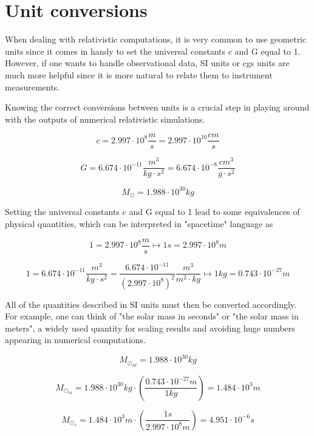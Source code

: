 \appendix
{}
\chapter{Unit conversions}\label{unit conv}

When dealing with relativistic computations, it is very common to use geometric units since it comes in handy to set the universal constants c and G equal to 1. However, if one wants to handle observational data, SI units or cgs units are much more helpful since it is more natural to relate them to instrument measurements.

Knowing the correct conversions between units is a crucial step in playing around with the outputs of numerical relativistic simulations.

$$
c = 2.997\cdot10^8 \frac{m}{s} = 2.997\cdot10^{10} \frac{cm}{s}
$$

$$ 
G = 6.674\cdot10^{-11} \frac{m^3}{kg \cdot s^2}  = 6.674\cdot10^{-8} \frac{cm^3}{g \cdot s^2}
$$

$$
M_{\odot} = 1.988\cdot10^{30} kg
$$

Setting  the universal constants c and G equal to 1 lead to some equivalences of physical quantities, which can be interpreted in "spacetime" language as
  
$$
1 = 2.997\cdot10^8 \frac{m}{s} \longmapsto 1s = 2.997\cdot10^8 m
$$

$$ 
1 = 6.674\cdot10^{-11} \frac{m^3}{kg \cdot s^2} = \frac{6.674\cdot10^{-11}}{\left( 2.997\cdot 10^8 \right)^2} \frac{m^3}{m^2 \cdot kg} \longmapsto 1kg = 0.743 \cdot 10^{-27}m
$$

All of the quantities described in SI units must then be converted accordingly. For example, one can think of "the solar mass in seconds" or "the solar mass in meters", a widely used quantity for scaling results and avoiding huge numbers appearing in numerical computations.

$$
M_{\odot_{SI}} = 1.988\cdot10^{30} kg
$$

$$
M_{\odot_{m}} = 1.988\cdot10^{30} kg \cdot \left( \frac{0.743\cdot 10^{-27}m}{1kg} \right) = 1.484 \cdot 10^{3} m
$$

$$
M_{\odot_{s}} = 1.484 \cdot 10^{3} m \cdot \left( \frac{1s}{2.997\cdot10^8 m} \right) = 4.951 \cdot 10^{-6} s
$$

